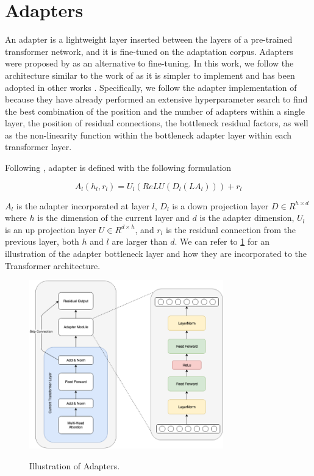 \section{Adapters}
\label{sec:bm_adapters}
An adapter is a lightweight layer inserted between the layers of a pre-trained transformer network, and it is fine-tuned on the adaptation corpus. Adapters were proposed by  as an alternative to fine-tuning. In this work, we follow the architecture similar to the work of  as it is simpler to implement and has been adopted in other works . Specifically, we follow the adapter implementation of  because they have already performed an extensive hyperparameter search to find the best combination of the position and the number of adapters within a single layer, the position of residual connections, the bottleneck residual factors, as well as the non-linearity function within the bottleneck adapter layer within each transformer layer.

Following , adapter is defined with the following formulation

$$A_l(h_l, r_l) = U_l(ReLU(D_l(LA_l))) + r_l $$

$A_l$ is the adapter incorporated at layer $l$, $D_l$ is a down projection layer $D \in R^{h \times d}$ where $h$ is the dimension of the current layer and $d$ is the adapter dimension, $U_l$ is an up projection layer $U \in R^{d \times h}$, and $r_l$ is the residual connection from the previous layer, both $h$ and $l$ are larger than $d$. We can refer to \cref{img:adapters} for an illustration of the adapter bottleneck layer and how they are incorporated to the Transformer architecture.

\begin{figure}[h]
    {\includegraphics[width=0.75\textwidth]{img/adapter_module.png}}
    \centering
    \caption{Illustration of Adapters.}
    \label{img:adapters}
\end{figure}

